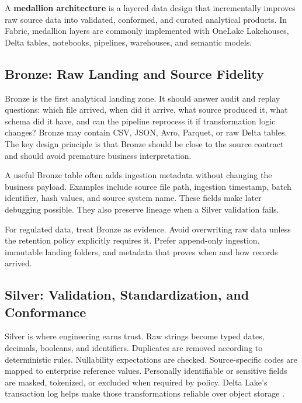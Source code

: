 \begin{definitionbox}
A \textbf{medallion architecture} is a layered data design that incrementally improves raw source data into validated, conformed, and curated analytical products. In Fabric, medallion layers are commonly implemented with OneLake Lakehouses, Delta tables, notebooks, pipelines, warehouses, and semantic models.
\end{definitionbox}

\subsection{Bronze: Raw Landing and Source Fidelity}
Bronze is the first analytical landing zone. It should answer audit and replay questions: which file arrived, when did it arrive, what source produced it, what schema did it have, and can the pipeline reprocess it if transformation logic changes? Bronze may contain CSV, JSON, Avro, Parquet, or raw Delta tables. The key design principle is that Bronze should be close to the source contract and should avoid premature business interpretation.

A useful Bronze table often adds ingestion metadata without changing the business payload. Examples include source file path, ingestion timestamp, batch identifier, hash values, and source system name. These fields make later debugging possible. They also preserve lineage when a Silver validation fails.

\begin{tipbox}
For regulated data, treat Bronze as evidence. Avoid overwriting raw data unless the retention policy explicitly requires it. Prefer append-only ingestion, immutable landing folders, and metadata that proves when and how records arrived.
\end{tipbox}

\subsection{Silver: Validation, Standardization, and Conformance}
Silver is where engineering earns trust. Raw strings become typed dates, decimals, booleans, and identifiers. Duplicates are removed according to deterministic rules. Nullability expectations are checked. Source-specific codes are mapped to enterprise reference values. Personally identifiable or sensitive fields are masked, tokenized, or excluded when required by policy. Delta Lake's transaction log helps make those transformations reliable over object storage \cite{armbrust2020delta,deltaLakeDocs}.

